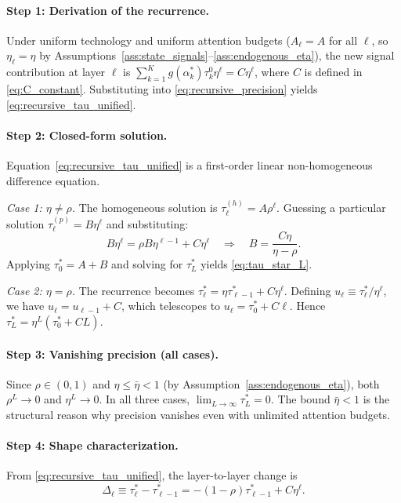 \paragraph{Step 1: Derivation of the recurrence.}
Under uniform technology and uniform attention budgets ($A_\ell = A$ for all $\ell$, so $\eta_\ell = \eta$ by Assumptions~\ref{ass:state_signals}--\ref{ass:endogenous_eta}), the new signal contribution at layer $\ell$ is $\sum_{k=1}^{K} g(\alpha^*_k) \tau^0_k \eta^\ell = C\eta^\ell$, where $C$ is defined in \eqref{eq:C_constant}. Substituting into \eqref{eq:recursive_precision} yields \eqref{eq:recursive_tau_unified}.

\paragraph{Step 2: Closed-form solution.}
Equation~\eqref{eq:recursive_tau_unified} is a first-order linear non-homogeneous difference equation.

\textit{Case 1: $\eta \neq \rho$.} The homogeneous solution is $\tau^{(h)}_{\ell} = A \rho^{\ell}$. Guessing a particular solution $\tau^{(p)}_{\ell} = B \eta^{\ell}$ and substituting:
\begin{equation*}
B\eta^{\ell} = \rho B \eta^{\ell-1} + C\eta^{\ell}
\quad\Longrightarrow\quad
B = \frac{C\eta}{\eta - \rho}.
\end{equation*}
Applying $\tau^{*}_{0} = A + B$ and solving for $\tau^{*}_{L}$ yields \eqref{eq:tau_star_L}.

\textit{Case 2: $\eta = \rho$.} The recurrence becomes $\tau^{*}_{\ell} = \eta \tau^{*}_{\ell-1} + C\eta^{\ell}$. Defining $u_{\ell} \equiv \tau^{*}_{\ell}/\eta^{\ell}$, we have $u_{\ell} = u_{\ell-1} + C$, which telescopes to $u_{\ell} = \tau^{*}_{0} + C\ell$. Hence $\tau^{*}_{L} = \eta^{L}(\tau^{*}_{0} + CL)$.

\paragraph{Step 3: Vanishing precision (all cases).}
Since $\rho \in (0,1)$ and $\eta \leq \bar{\eta} < 1$ (by Assumption~\ref{ass:endogenous_eta}), both $\rho^{L} \to 0$ and $\eta^{L} \to 0$. In all three cases, $\lim_{L\to\infty} \tau^{*}_{L} = 0$. The bound $\bar{\eta} < 1$ is the structural reason why precision vanishes even with unlimited attention budgets.

\paragraph{Step 4: Shape characterization.}
From \eqref{eq:recursive_tau_unified}, the layer-to-layer change is
\begin{equation}\label{eq:app_delta_tau}
\Delta_{\ell} \equiv \tau^{*}_{\ell} - \tau^{*}_{\ell-1} = -(1-\rho)\tau^{*}_{\ell-1} + C\eta^{\ell}.
\end{equation}

